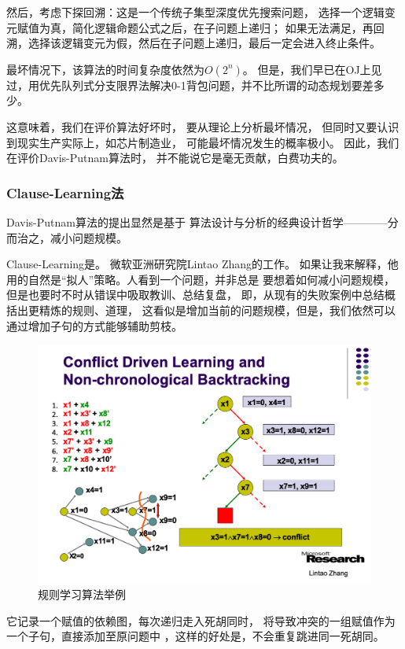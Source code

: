 \documentclass[12pt]{ctexart}
\begin{document}
然后，考虑下探回溯：这是一个传统子集型深度优先搜索问题，
选择一个逻辑变元赋值为真，简化逻辑命题公式之后，在子问题上递归；
如果无法满足，再回溯，选择该逻辑变元为假，然后在子问题上递归，最后一定会进入终止条件。

最坏情况下，该算法的时间复杂度依然为$O(2^n)$。
但是，我们早已在OJ上见过，用优先队列式分支限界法解决0-1背包问题，并不比所谓的动态规划要差多少。

这意味着，我们在评价算法好坏时，
要从理论上分析最坏情况，
但同时又要认识到现实生产实际上，如芯片制造业，
可能最坏情况发生的概率极小。
因此，我们在评价Davis-Putnam算法时，
并不能说它是毫无贡献，白费功夫的。

\subsubsection{Clause-Learning法}

Davis-Putnam算法的提出显然是基于 算法设计与分析的经典设计哲学————分而治之，减小问题规模。

Clause-Learning是。 微软亚洲研究院Lintao Zhang的工作。 如果让我来解释，他用的自然是“拟人”策略。人看到一个问题，并非总是
要想着如何减小问题规模，但是也要时不时从错误中吸取教训、总结复盘， 即，从现有的失败案例中总结概括出更精炼的规则、道理，
这看似是增加当前的问题规模，但是，我们依然可以 通过增加子句的方式能够辅助剪枝。

\begin{figure}[htbp]
    \centering
    \includegraphics[width=\linewidth]{cl.png}
    \caption{规则学习算法举例}
\end{figure}

它记录一个赋值的依赖图，每次递归走入死胡同时，
将导致冲突的一组赋值作为一个子句，直接添加至原问题中
，这样的好处是，不会重复跳进同一死胡同。
\end{document}
